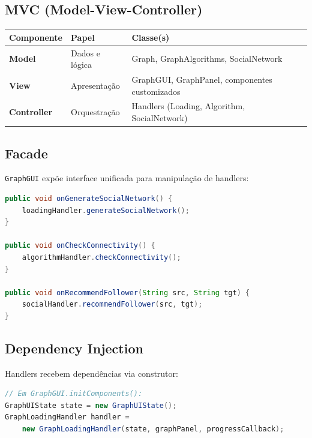 \documentclass[12pt,a4paper]{article}
\begin{document}
\subsection{MVC (Model-View-Controller)}

\begin{table}[h]
\centering
\begin{tabular}{|l|l|l|}
\hline
\textbf{Componente} & \textbf{Papel} & \textbf{Classe(s)} \\
\hline
\textbf{Model} & Dados e lógica & Graph, GraphAlgorithms, SocialNetwork \\
\hline
\textbf{View} & Apresentação & GraphGUI, GraphPanel, componentes customizados \\
\hline
\textbf{Controller} & Orquestração & Handlers (Loading, Algorithm, SocialNetwork) \\
\hline
\end{tabular}
\end{table}

\subsection{Facade}

\texttt{GraphGUI} expõe interface unificada para manipulação de handlers:

\begin{lstlisting}[language=Java, caption=Facade em GraphGUI]
public void onGenerateSocialNetwork() {
    loadingHandler.generateSocialNetwork();
}

public void onCheckConnectivity() {
    algorithmHandler.checkConnectivity();
}

public void onRecommendFollower(String src, String tgt) {
    socialHandler.recommendFollower(src, tgt);
}
\end{lstlisting}

\subsection{Dependency Injection}

Handlers recebem dependências via construtor:

\begin{lstlisting}[language=Java, caption=Injeção de Dependência]
// Em GraphGUI.initComponents():
GraphUIState state = new GraphUIState();
GraphLoadingHandler handler =
    new GraphLoadingHandler(state, graphPanel, progressCallback);
\end{lstlisting}
\end{document}
